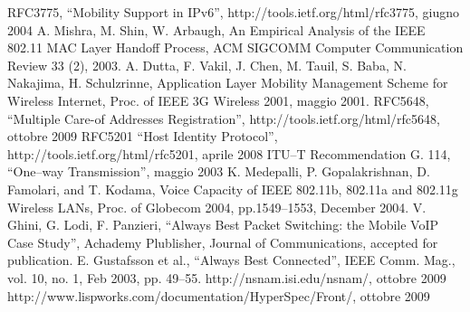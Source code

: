 \documentclass[12pt,a4paper,openright,twoside]{book}
\renewcommand{\chaptermark}[1]{\markboth{\thechapter.\ #1}{}}
\begin{document}

\begin{thebibliography}{90}
\rhead[\fancyplain{}{\bfseries \leftmark}]{\fancyplain{}{\bfseries
\thepage}}
 RFC3775, ``Mobility Support in IPv6'',
  http://tools.ietf.org/html/rfc3775, giugno 2004
 A. Mishra, M. Shin, W. Arbaugh, An
  Empirical Analysis of the IEEE 802.11 MAC Layer Handoff Process, ACM
  SIGCOMM Computer Communication Review 33 (2), 2003.
 A. Dutta, F. Vakil, J. Chen,
  M. Tauil, S. Baba, N. Nakajima, H.  Schulzrinne, Application Layer
  Mobility Management Scheme for Wireless Internet, Proc. of IEEE 3G
  Wireless 2001, maggio 2001.
 RFC5648, ``Multiple Care-of Addresses
  Registration'', http://tools.ietf.org/html/rfc5648, ottobre 2009
 RFC5201 ``Host Identity Protocol'',
  http://tools.ietf.org/html/rfc5201, aprile 2008
 ITU--T Recommendation G. 114, ``One--way
  Transmission'', maggio 2003
 K. Medepalli, P. Gopalakrishnan, D. Famolari,
  and T. Kodama, Voice Capacity of IEEE 802.11b, 802.11a and 802.11g
  Wireless LANs, Proc. of Globecom 2004, pp.1549–1553, December 2004.
 V. Ghini, G. Lodi, F. Panzieri, ``Always Best
  Packet Switching: the Mobile VoIP Case Study'', Achademy Plublisher,
  Journal of Communications, accepted for publication.
 E. Gustafsson et al., ``Always Best Connected'',
  IEEE Comm. Mag., vol. 10, no. 1, Feb 2003, pp. 49--55.
 http://nsnam.isi.edu/nsnam/, ottobre 2009
  http://www.lispworks.com/documentation/HyperSpec/Front/,
  ottobre 2009
\end{thebibliography}
\end{document}

